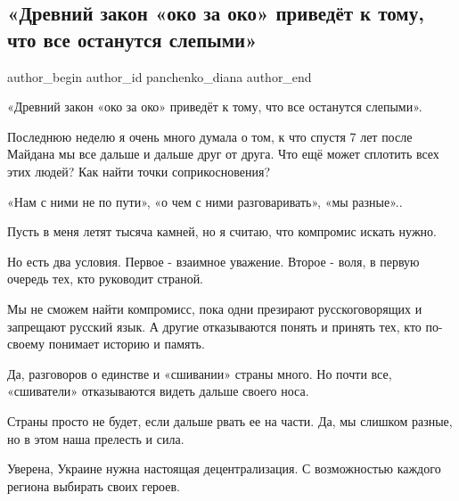  
 
 
 
 
 
\subsection{«Древний закон «око за око» приведёт к тому, что все останутся слепыми»}
\label{sec:31_07_2021.fb.panchenko_diana.1.oko_za_oko}
 
\ifcmt
 author_begin
   author_id panchenko_diana
 author_end
\fi

«Древний закон «око за око» приведёт к тому, что все останутся слепыми».

Последнюю неделю я очень много думала о том, к что спустя 7 лет после Майдана
мы все дальше и дальше друг от друга. Что ещё может сплотить всех этих людей?
Как найти точки соприкосновения? 

«Нам с ними не по пути», «о чем с ними разговаривать», «мы разные»..

Пусть в меня летят тысяча камней, но я считаю, что компромис искать нужно. 

Но есть два условия. Первое - взаимное уважение. Второе - воля, в первую
очередь тех, кто руководит страной. 

Мы не сможем найти компромисс, пока одни презирают русскоговорящих и запрещают
русский язык. А другие   отказываются понять и принять тех, кто по-своему
понимает  историю и память. 

Да, разговоров  о единстве и «сшивании» страны много. Но почти все, «сшиватели»
отказываются видеть дальше своего носа. 

Страны просто не будет, если дальше рвать ее на части. Да, мы слишком разные,
но в этом наша прелесть и сила. 

Уверена, Украине нужна настоящая децентрализация. С возможностью каждого
региона выбирать своих героев. 

